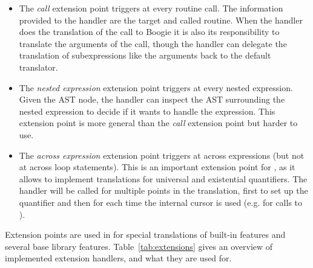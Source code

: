 \begin{itemize}

\item The \emph{call} extension point triggers at every routine call. The information provided to the handler are the target and called routine. When the handler does the translation of the call to Boogie it is also its responsibility to translate the arguments of the call, though the handler can delegate the translation of subexpressions like the arguments back to the default translator.

\item The \emph{nested expression} extension point triggers at every nested expression. Given the AST node, the handler can inspect the AST surrounding the nested expression to decide if it wants to handle the expression. This extension point is more general than the \emph{call} extension point but harder to use.

\item The \emph{across expression} extension point triggers at across expressions (but not at across loop statements). This is an important extension point for \AutoProof, as it allows to implement translations for universal and existential quantifiers. The handler will be called for multiple points in the translation, first to set up the quantifier and then for each time the internal cursor is used (e.g. for calls to ).

\end{itemize}

Extension points are used in \AutoProof for special translations of built-in features and several base library features. Table~\ref{tab:extensions} gives an overview of implemented extension handlers, and what they are used for.

